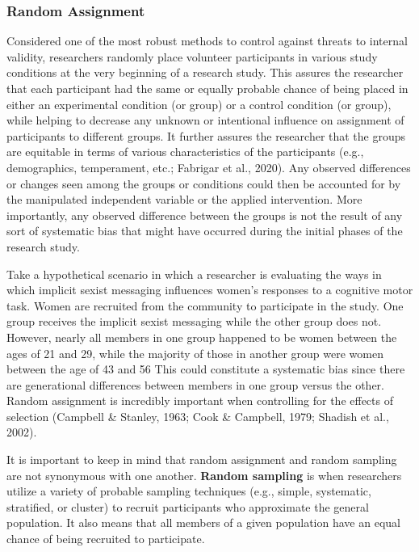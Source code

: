 \documentclass[
  11pt,
]{book}
\begin{document}
\hypertarget{random-assignment}{%
\subsubsection{Random Assignment}\label{random-assignment}}

Considered one of the most robust methods to control against threats to internal validity, researchers randomly place volunteer participants in various study conditions at the very beginning of a research study. This assures the researcher that each participant had the same or equally probable chance of being placed in either an experimental condition (or group) or a control condition (or group), while helping to decrease any unknown or intentional influence on assignment of participants to different groups. It further assures the researcher that the groups are equitable in terms of various characteristics of the participants (e.g., demographics, temperament, etc.; Fabrigar et al., 2020). Any observed differences or changes seen among the groups or conditions could then be accounted for by the manipulated independent variable or the applied intervention. More importantly, any observed difference between the groups is not the result of any sort of systematic bias that might have occurred during the initial phases of the research study.

Take a hypothetical scenario in which a researcher is evaluating the ways in which implicit sexist messaging influences women's responses to a cognitive motor task. Women are recruited from the community to participate in the study. One group receives the implicit sexist messaging while the other group does not. However, nearly all members in one group happened to be women between the ages of 21 and 29, while the majority of those in another group were women between the age of 43 and 56 This could constitute a systematic bias since there are generational differences between members in one group versus the other. Random assignment is incredibly important when controlling for the effects of selection (Campbell \& Stanley, 1963; Cook \& Campbell, 1979; Shadish et al., 2002).

It is important to keep in mind that random assignment and random sampling are not synonymous with one another. \textbf{Random sampling} is when researchers utilize a variety of probable sampling techniques (e.g., simple, systematic, stratified, or cluster) to recruit participants who approximate the general population. It also means that all members of a given population have an equal chance of being recruited to participate.
\end{document}
